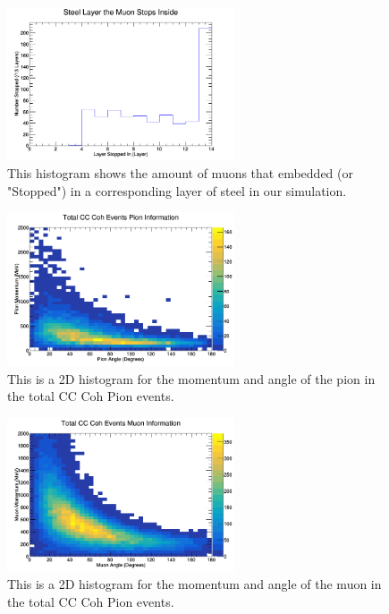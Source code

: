 \documentclass[11pt]{article}
\begin{document}
\begin{figure}[H]
\centering
\includegraphics[width=0.6\textwidth]{OldNMReinSehgalImages/7-LayerPenetrationNMORS.png}
\caption{This histogram shows the amount of muons that embedded (or "Stopped") in a corresponding layer of steel in our simulation.}
\end{figure}

\begin{figure}[H]
\centering
\includegraphics[width=0.6\textwidth]{OldNMReinSehgalImages/8-TotalCCCohPionInfoNMORS.png}
\caption{This is a 2D histogram for the momentum and angle of the pion in the total CC Coh Pion events.}
\end{figure}

\begin{figure}[H]
\centering
\includegraphics[width=0.6\textwidth]{OldNMReinSehgalImages/9-TotalCCCohMuonInfoNMORS.png}
\caption{This is a 2D histogram for the momentum and angle of the muon in the total CC Coh Pion events.}
\end{figure}
\end{document}
